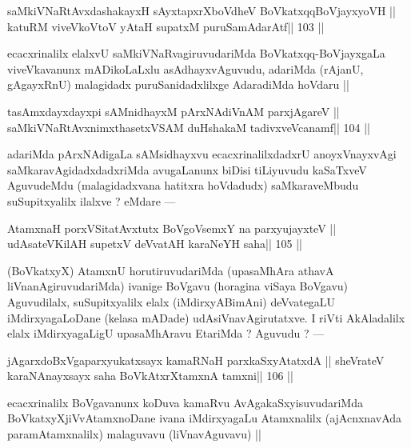 \begin{shl}
saMkiVNaRtAvxdashakayxH sAyxtapxrXboVdheV BoVkatxqqBoVjayxyoVH ||
katuRM viveVkoV\s toV yAtaH supatxM puruSamAdarAtf\hfill || 103 ||
\end{shl}

\begin{artha}
ecacxrinalilx elalxvU saMkiVNaRvagiruvudariMda BoVkatxqq-BoVjayxgaLa viveVkavanunx mADikoLaLxlu asAdhayxvAguvudu, adariMda (rAjanU, gAgayxRnU) malagidadx puruSanidadxlilxge AdaradiMda hoVdaru ||
\end{artha}

\begin{shl}
tasAmxdayxdayxpi sAMnidhayxM pArxNAdiVnAM parxjAgareV ||
saMkiVNaRtAvxnimxthasetxVSAM duHshakaM tadivxveVcanamf\hfill || 104 ||
\end{shl}

\begin{artha}
adariMda pArxNAdigaLa sAMsidhayxvu ecacxrinalilxdadxrU anoyxVnayxvAgi saMkaravAgidadxdadxriMda avugaLanunx biDisi tiLiyuvudu kaSaTxveV AguvudeMdu (malagidadxvana hatitxra hoVdadudx) saMkaraveMbudu suSupitxyalilx ilalxve ? eMdare ---
\end{artha}

\begin{shl}
AtamxnaH porxVSitatAvxtutx BoVgoV\s semxY na parxyujayxteV ||
udAsateV\s KilAH supetxV deVvatAH karaNeYH saha\hfill || 105 ||
\end{shl}

\begin{artha}
(BoVkatxyX) AtamxnU horutiruvudariMda (upasaMhAra athavA liVnanAgiruvudariMda) ivanige BoVgavu (horagina viSaya BoVgavu) Aguvudilalx, suSupitxyalilx elalx (iMdirxyABimAni) deVvategaLU iMdirxyagaLoDane (kelasa mADade) udAsiVnavAgirutatxve. I riVti AkAladalilx elalx iMdirxyagaLigU upasaMhAravu EtariMda ? Aguvudu ? ---
\end{artha}

\begin{shl}
jAgarxdoBxVgaparxyukatxsayx kamaRNaH parxkaSxyAtatxdA ||
sheVrateV karaNAnayxsayx saha BoVkAtxrX\s\s tamxnA \s\s tamxni\hfill || 106 ||
\end{shl}

\begin{artha}
ecacxrinalilx BoVgavanunx koDuva kamaRvu AvAgakaSxyisuvudariMda BoVkatxyXjiVvAtamxnoDane ivana iMdirxyagaLu Atamxnalilx (ajAcnxnavAda paramAtamxnalilx) malaguvavu (liVnavAguvavu) ||
\end{artha}

